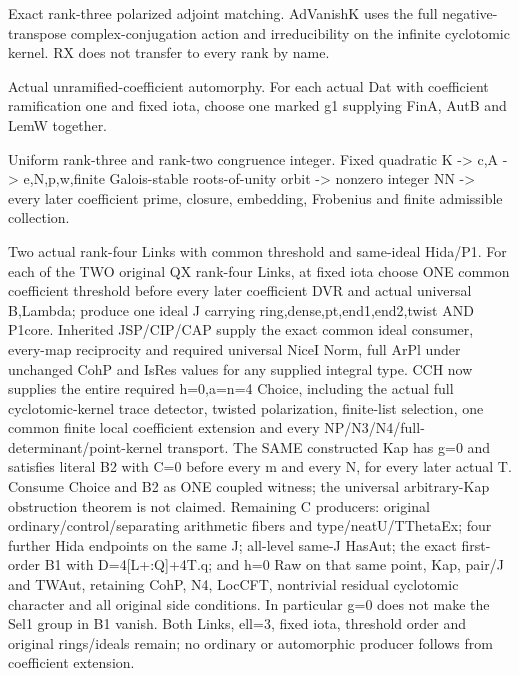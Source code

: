 \begin{description}[style=nextline]
\item[10. AD\_VANISH\_K\_MATCH --- D] Exact rank-three polarized adjoint matching. AdVanishK uses the full negative-transpose complex-conjugation action and irreducibility on the infinite cyclotomic kernel. RX does not transfer to every rank by name.

\item[11. AUT\_UNRAM\_COEF --- C] Actual unramified-coefficient automorphy. For each actual Dat with coefficient ramification one and fixed iota, choose one marked g1 supplying FinA, AutB and LemW together.

\item[12. CNR3 --- C] Uniform rank-three and rank-two congruence integer. Fixed quadratic K -> c,A -> e,N,p,w,finite Galois-stable roots-of-unity orbit -> nonzero integer NN -> every later coefficient prime, closure, embedding, Frobenius and finite admissible collection.

\item[13. COUNT\_II\_SUPPORT --- C] Two actual rank-four Links with common threshold and same-ideal Hida/P1. For each of the TWO original QX rank-four Links, at fixed iota choose ONE common coefficient threshold before every later coefficient DVR and actual universal B,Lambda; produce one ideal J carrying ring,dense,pt,end1,end2,twist AND P1core. Inherited JSP/CIP/CAP supply the exact common ideal consumer, every-map reciprocity and required universal NiceI Norm, full ArPl under unchanged CohP and IsRes values for any supplied integral type. CCH now supplies the entire required h=0,a=n=4 Choice, including the actual full cyclotomic-kernel trace detector, twisted polarization, finite-list selection, one common finite local coefficient extension and every NP/N3/N4/full-determinant/point-kernel transport. The SAME constructed Kap has g=0 and satisfies literal B2 with C=0 before every m and every N, for every later actual T. Consume Choice and B2 as ONE coupled witness; the universal arbitrary-Kap obstruction theorem is not claimed. Remaining C producers: original ordinary/control/separating arithmetic fibers and type/neatU/TThetaEx; four further Hida endpoints on the same J; all-level same-J HasAut; the exact first-order B1 with D=4[L+:Q]+4T.q; and h=0 Raw on that same point, Kap, pair/J and TWAut, retaining CohP, N4, LocCFT, nontrivial residual cyclotomic character and all original side conditions. In particular g=0 does not make the Sel1 group in B1 vanish. Both Links, ell=3, fixed iota, threshold order and original rings/ideals remain; no ordinary or automorphic producer follows from coefficient extension.


\end{description}
